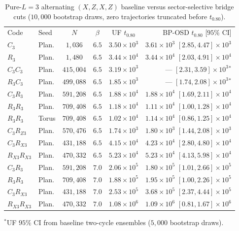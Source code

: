 \documentclass[aps,prx,reprint,superscriptaddress,nofootinbib,floatfix]{revtex4-2}
\begin{document}
\begin{table}[!htbp]
\caption{Pure-$L = 3$ alternating $(X, Z, X, Z)$ baseline versus sector-selective bridge cuts ($10{,}000$ bootstrap draws, zero trajectories truncated before $t_{0.80}$).}
\label{tab:frontier}
{\scriptsize
\setlength{\tabcolsep}{1.2pt}
\begin{ruledtabular}
\begin{tabular}{llcccr}
Code & Seed & $N$ & $\beta$ & UF $t_{0.80}$ & BP-OSD $t_{0.80}$ [$95\%$ CI] \\
\colrule
$C_3$ & Plan. & $1{,}036$ & $6.5$ & $3.50{\times}10^3$ & $3.61{\times}10^3$ $[2.85, 4.47]{\times}10^3$ \\
$R_3$ & Plan. & $1{,}480$ & $6.5$ & $3.44{\times}10^4$ & $3.44{\times}10^4$ $[2.03, 4.91]{\times}10^4$ \\
\colrule
$C_3 C_3$ & Plan. & $415{,}004$ & $6.5$ & $3.19{\times}10^3$ & --- $[2.31, 3.59]{\times}10^3$$^*$ \\
$R_3 C_3$ & Plan. & $499{,}088$ & $6.5$ & $1.85{\times}10^3$ & --- $[1.74, 2.08]{\times}10^3$$^*$ \\
$C_3 R_3$ & Plan. & $591{,}208$ & $6.5$ & $1.88{\times}10^4$ & $1.88{\times}10^4$ $[1.69, 2.11]{\times}10^4$ \\
$R_3 R_3$ & Plan. & $709{,}408$ & $6.5$ & $1.18{\times}10^4$ & $1.11{\times}10^4$ $[1.00, 1.28]{\times}10^4$ \\
$R_3 R_3$ & Torus & $709{,}408$ & $6.5$ & $1.02{\times}10^4$ & $1.14{\times}10^4$ $[0.86, 1.25]{\times}10^4$ \\
\colrule
$C_3 R_{Z3}$ & Plan. & $570{,}476$ & $6.5$ & $1.74{\times}10^3$ & $1.80{\times}10^3$ $[1.44, 2.08]{\times}10^3$ \\
$C_3 R_{X3}$ & Plan. & $431{,}188$ & $6.5$ & $4.15{\times}10^4$ & $4.23{\times}10^4$ $[2.80, 4.80]{\times}10^4$ \\
$R_{X3} R_{X3}$ & Plan. & $470{,}332$ & $6.5$ & $5.23{\times}10^4$ & $5.23{\times}10^4$ $[4.13, 5.98]{\times}10^4$ \\
\colrule
$C_3 R_3$ & Plan. & $591{,}208$ & $7.0$ & $2.06{\times}10^5$ & $1.80{\times}10^5$ $[1.01, 2.66]{\times}10^5$ \\
$R_3 R_3$ & Plan. & $709{,}408$ & $7.0$ & $1.88{\times}10^5$ & $1.95{\times}10^5$ $[1.00, 2.26]{\times}10^5$ \\
$C_3 R_{X3}$ & Plan. & $431{,}188$ & $7.0$ & $2.53{\times}10^5$ & $3.68{\times}10^5$ $[2.37, 4.44]{\times}10^5$ \\
$R_{X3} R_{X3}$ & Plan. & $470{,}332$ & $7.0$ & $1.08{\times}10^6$ & $1.09{\times}10^6$ $[0.81, 1.67]{\times}10^6$ \\
\end{tabular}
\end{ruledtabular}
}
\raggedright\footnotesize $^*$UF $95\%$ CI from baseline two-cycle ensembles ($5{,}000$ bootstrap draws).
\end{table}
\end{document}
